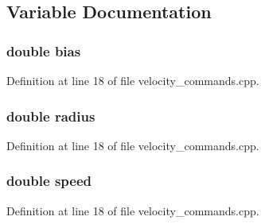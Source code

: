 \subsection{\-Variable \-Documentation}
\subsubsection[{bias}]{\setlength{\rightskip}{0pt plus 5cm}double {\bf bias}}\label{velocity__commands_8cpp_aa6231a5027112a1cf56c610e6d7d91c5}


\-Definition at line 18 of file velocity\-\_\-commands.\-cpp.

\subsubsection[{radius}]{\setlength{\rightskip}{0pt plus 5cm}double {\bf radius}}\label{velocity__commands_8cpp_a3f67c53b80389c5f53961936edba04c9}


\-Definition at line 18 of file velocity\-\_\-commands.\-cpp.

\subsubsection[{speed}]{\setlength{\rightskip}{0pt plus 5cm}double {\bf speed}}\label{velocity__commands_8cpp_a6dc6e6f3c75c509ce943163afb5dade7}


\-Definition at line 18 of file velocity\-\_\-commands.\-cpp.


